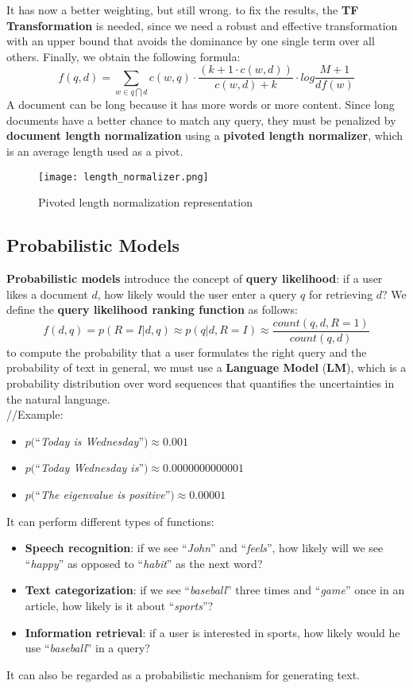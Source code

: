 \documentclass{article}
\begin{document}
It has now a better weighting, but still wrong.
to fix the results, the \textbf{TF Transformation} is needed, since we need a robust and effective transformation with an upper bound that avoids the dominance by one single term over all others.
Finally, we obtain the following formula:
\[
    f(q,d) = \sum_{w \in q \bigcap d} c(w,q) \cdot \displaystyle\frac{(k + 1 \cdot c(w,d))}{c(w,d) + k} \cdot log \displaystyle\frac{M + 1}{df(w)}
\]
A document can be long because it has more words or more content. 
Since long documents have a better chance to match any query, they must be penalized by \textbf{document length normalization} using a \textbf{pivoted length normalizer}, which is an average length used as a pivot.
\begin{figure}[H]
    \centering
    \texttt{[image: length\_normalizer.png]}
    \caption{Pivoted length normalization representation}
\end{figure}


\subsection{Probabilistic Models}
\textbf{Probabilistic models} introduce the concept of \textbf{query likelihood}: if a user likes a document $d$, how likely would the user enter a query $q$ for retrieving $d$? We define the \textbf{query likelihood ranking function} as follows:
\[
    f(d,q) = p(R = I | d,q) \approx p(q |d, R = I) \approx \displaystyle\frac{count(q,d, R = 1)}{count(q,d)}
\]
to compute the probability that a user formulates the right query and the probability of text in general, we must use a \textbf{Language Model} (\textbf{LM}), which is a probability distribution over word sequences that quantifies the uncertainties in the natural language. \\
//Example:
\begin{itemize}
    \item $p($“\textit{Today is Wednesday}”$) \approx 0.001$
    \item $p($“\textit{Today Wednesday is}”$) \approx 0.0000000000001$
    \item $p($“\textit{The eigenvalue is positive}”$) \approx 0.00001$
\end{itemize}
It can perform different types of functions:
\begin{itemize}
    \item \textbf{Speech recognition}: if we see “\textit{John}” and “\textit{feels}”, how likely will we see “\textit{happy}” as opposed to “\textit{habit}” as the next word?
    \item \textbf{Text categorization}: if we see “\textit{baseball}” three times and “\textit{game}” once in an article, how likely is it about “\textit{sports}”?
    \item \textbf{Information retrieval}: if a user is interested in sports, how likely would he use “\textit{baseball}” in a query?
\end{itemize}
It can also be regarded as a probabilistic mechanism for generating text.
\end{document}
